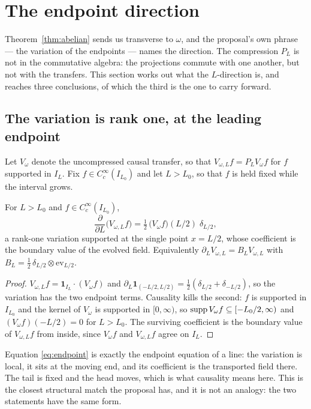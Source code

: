 \section{The endpoint direction}\label{sec:endpoint}

Theorem~\ref{thm:abelian} sends us transverse to $\omega$, and the proposal's own
phrase --- the variation of the endpoints --- names the direction. The compression
$P_L$ is not in the commutative algebra: the projections commute with one
another, but not with the transfers. This section works out what the
$L$-direction is, and reaches three conclusions, of which the third is the one to
carry forward.

\subsection{The variation is rank one, at the leading endpoint}

Let $V_\omega$ denote the uncompressed causal transfer, so that
$V_{\omega,L}f=P_LV_\omega f$ for $f$ supported in $I_L$. Fix
$f\in C_c^\infty(I_{L_0})$ and let $L>L_0$, so that $f$ is held fixed while the
interval grows.

\begin{proposition}\label{prop:endpoint}
For $L>L_0$ and $f\in C_c^\infty(I_{L_0})$,
\begin{equation}\label{eq:endpoint}
 \frac{\partial}{\partial L}\big(V_{\omega,L}f\big)
 =\tfrac12\,\big(V_\omega f\big)(L/2)\;\delta_{L/2},
\end{equation}
a rank-one variation supported at the single point $x=L/2$, whose coefficient is
the boundary value of the evolved field. Equivalently
$\partial_LV_{\omega,L}=B_LV_{\omega,L}$ with
$B_L=\frac12\,\delta_{L/2}\otimes\mathrm{ev}_{L/2}$.
\end{proposition}

\begin{proof}
$V_{\omega,L}f=\mathbf1_{I_L}\cdot(V_\omega f)$ and
$\partial_L\mathbf1_{(-L/2,L/2)}=\frac12(\delta_{L/2}+\delta_{-L/2})$, so the
variation has the two endpoint terms. Causality kills the second: $f$ is
supported in $I_{L_0}$ and the kernel of $V_\omega$ is supported in
$[0,\infty)$, so $\operatorname{supp} V_\omega f\subseteq[-L_0/2,\infty)$ and
$(V_\omega f)(-L/2)=0$ for $L>L_0$. The surviving coefficient is the boundary
value of $V_{\omega,L}f$ from inside, since $V_\omega f$ and $V_{\omega,L}f$
agree on $I_L$.
\end{proof}

Equation \eqref{eq:endpoint} is exactly the endpoint equation of a line: the
variation is local, it sits at the moving end, and its coefficient is the
transported field there. The tail is fixed and the head moves, which is what
causality means here. This is the closest structural match the proposal has, and
it is not an analogy: the two statements have the same form.

